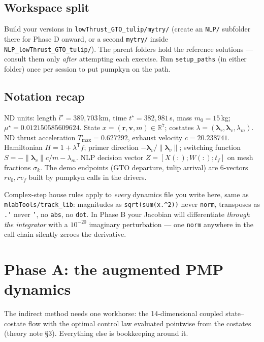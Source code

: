\documentclass[11pt,letterpaper]{article}
\newcommand{\R}{\mathbb{R}}
\newcommand{\T}{^{\mathsf{T}}}
\newcommand{\rvec}{\mathbf{r}}
\newcommand{\vvec}{\mathbf{v}}
\newcommand{\lamr}{\bm{\lambda}_r}
\newcommand{\lamv}{\bm{\lambda}_v}
\newcommand{\lamm}{\lambda_m}
\begin{document}
\subsection{Workspace split}

Build your versions in \texttt{lowThrust\_GTO\_tulip/mytry/} (create an
\texttt{NLP/} subfolder there for Phase D onward, or a second
\texttt{mytry/} inside \texttt{NLP\_lowThrust\_GTO\_tulip/}). The parent
folders hold the reference solutions --- consult them only \emph{after}
attempting each exercise. Run \texttt{setup\_paths} (in either folder) once
per session to put pumpkyn on the path.

\subsection{Notation recap}

ND units: length $l^\star = 389{,}703$\,km, time $t^\star = 382{,}981$\,s,
mass $m_0 = 15$\,kg; $\mu^\star = 0.012150585609624$. State
$x = (\rvec,\vvec,m) \in \R^7$; costates
$\lambda = (\lamr,\lamv,\lamm)$. ND thrust acceleration
$T_{\max} = 0.627292$, exhaust velocity $c = 20.238741$. Hamiltonian
$H = 1 + \lambda\T f$; primer direction $-\lamv/\|\lamv\|$; switching
function $S = -\|\lamv\| c/m - \lamm$. NLP decision vector
$Z = [X(:); W(:); t_f]$ on mesh fractions $\sigma_k$. The demo endpoints
(GTO departure, tulip arrival) are 6-vectors $rv_0, rv_f$ built by pumpkyn
calls in the drivers.

\begin{hint}
Complex-step house rules apply to \emph{every} dynamics file you write
here, same as \texttt{mlabTools/track\_lib}: magnitudes as
\texttt{sqrt(sum(x.\^{}2))} never \texttt{norm}, transposes as \texttt{.'}
never \texttt{'}, no \texttt{abs}, no \texttt{dot}. In Phase B your
Jacobian will differentiate \emph{through the integrator} with a
$10^{-20}$ imaginary perturbation --- one \texttt{norm} anywhere in the
call chain silently zeroes the derivative.
\end{hint}

\section{Phase A: the augmented PMP dynamics}

The indirect method needs one workhorse: the 14-dimensional coupled
state--costate flow with the optimal control law evaluated pointwise from
the costates (theory note \S3). Everything else is bookkeeping around it.
\end{document}
